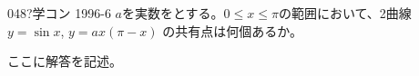 \begin{thm}{048}{\hosi ?}{学コン 1996-6}
 $a$を実数をとする。$0\le x \le \pi$の範囲において、2曲線 $y=\sin x$, $y=ax(\pi-x)$ の共有点は何個あるか。
\end{thm}

ここに解答を記述。